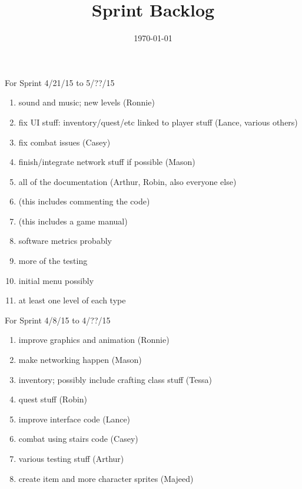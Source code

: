\documentclass[12pt]{article}
\title{Sprint Backlog}
\date{\today}
\begin{document}
\maketitle



\begin{section}{For Sprint 4/21/15 to 5/??/15}
\begin{enumerate}

\item sound and music; new levels (Ronnie)
\item fix UI stuff: inventory/quest/etc linked to player stuff (Lance, various others)
\item fix combat issues (Casey)
\item finish/integrate network stuff if possible (Mason)
\item all of the documentation (Arthur, Robin, also everyone else)
\item (this includes commenting the code)
\item (this includes a game manual)
\item software metrics probably
\item more of the testing
\item initial menu possibly
\item at least one level of each type


\end{enumerate}
\end{section}






\begin{section}{For Sprint 4/8/15 to 4/??/15}
\begin{enumerate}


\item improve graphics and animation (Ronnie)
\item make networking happen (Mason) 
\item inventory; possibly include crafting class stuff (Tessa) 
\item quest stuff (Robin)
\item improve interface code (Lance)
\item combat using stairs code (Casey)
\item various testing stuff (Arthur)
\item create item and more character sprites (Majeed)


\end{enumerate}
\end{section}
\end{document}
